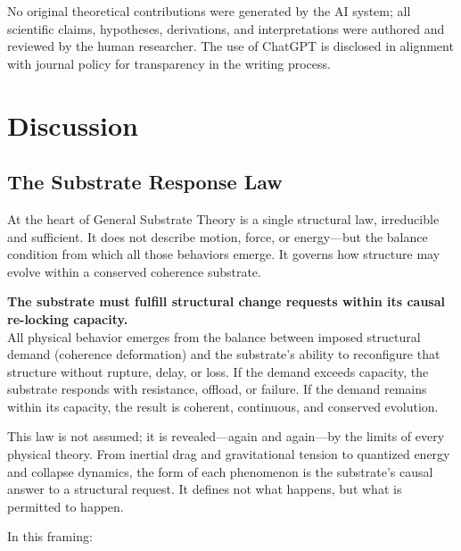 \documentclass[entropy,article,submit,pdftex,moreauthors]{Definitions/mdpi}
\begin{document}
No original theoretical contributions were generated by the AI system; all scientific claims, hypotheses, derivations, and interpretations were authored and reviewed by the human researcher. The use of ChatGPT is disclosed in alignment with journal policy for transparency in the writing process.


\section{Discussion}
\subsection{The Substrate Response Law}

At the heart of General Substrate Theory is a single structural law, irreducible and sufficient. It does not describe motion, force, or energy—but the balance condition from which all those behaviors emerge. It governs how structure may evolve within a conserved coherence substrate.

\begin{tcolorbox}[colback=black!2!white,colframe=black,title=The Substrate Response Law]
\textbf{The substrate must fulfill structural change requests within its causal re-locking capacity.} \\
All physical behavior emerges from the balance between imposed structural demand (coherence deformation) and the substrate’s ability to reconfigure that structure without rupture, delay, or loss. If the demand exceeds capacity, the substrate responds with resistance, offload, or failure. If the demand remains within its capacity, the result is coherent, continuous, and conserved evolution.
\end{tcolorbox}

This law is not assumed; it is revealed—again and again—by the limits of every physical theory. From inertial drag and gravitational tension to quantized energy and collapse dynamics, the form of each phenomenon is the substrate’s causal answer to a structural request. It defines not what happens, but what is permitted to happen.

In this framing:
\end{document}
